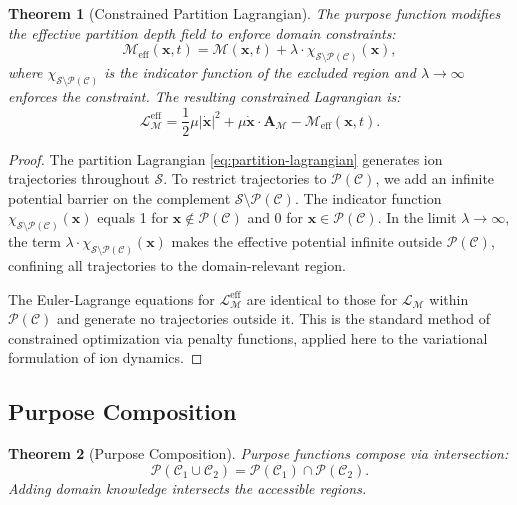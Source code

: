 \documentclass[11pt,twocolumn,a4paper]{article}
\newtheorem{theorem}{Theorem}[section]
\theoremstyle{definition}
\theoremstyle{remark}
\newcommand{\Sspace}{\mathcal{S}}
\newcommand{\Depth}{\mathcal{M}}
\newcommand{\partinert}{\mu}
\newcommand{\Apartition}{\mathbf{A}_{\mathcal{M}}}
\newcommand{\Lagr}{\mathcal{L}}
\newcommand{\Purpose}{\mathcal{P}}
\newcommand{\Context}{\mathcal{C}}
\begin{document}
\begin{theorem}[Constrained Partition Lagrangian]\label{thm:constrained-lagrangian}
The purpose function modifies the effective partition depth field to enforce domain constraints:
\begin{equation}\label{eq:constrained-lagrangian}
  \Depth_{\mathrm{eff}}(\mathbf{x}, t) = \Depth(\mathbf{x}, t) + \lambda \cdot \chi_{\Sspace \setminus \Purpose(\Context)}(\mathbf{x}),
\end{equation}
where $\chi_{\Sspace \setminus \Purpose(\Context)}$ is the indicator function of the excluded region and $\lambda \to \infty$ enforces the constraint. The resulting constrained Lagrangian is:
\begin{equation}\label{eq:lagrangian-constrained}
  \Lagr_{\Depth}^{\mathrm{eff}} = \frac{1}{2}\partinert |\dot{\mathbf{x}}|^2 + \partinert \dot{\mathbf{x}} \cdot \Apartition - \Depth_{\mathrm{eff}}(\mathbf{x}, t).
\end{equation}
\end{theorem}

\begin{proof}
The partition Lagrangian \eqref{eq:partition-lagrangian} generates ion trajectories throughout $\Sspace$. To restrict trajectories to $\Purpose(\Context)$, we add an infinite potential barrier on the complement $\Sspace \setminus \Purpose(\Context)$. The indicator function $\chi_{\Sspace \setminus \Purpose(\Context)}(\mathbf{x})$ equals 1 for $\mathbf{x} \notin \Purpose(\Context)$ and 0 for $\mathbf{x} \in \Purpose(\Context)$. In the limit $\lambda \to \infty$, the term $\lambda \cdot \chi_{\Sspace \setminus \Purpose(\Context)}(\mathbf{x})$ makes the effective potential infinite outside $\Purpose(\Context)$, confining all trajectories to the domain-relevant region.

The Euler-Lagrange equations for $\Lagr_{\Depth}^{\mathrm{eff}}$ are identical to those for $\Lagr_{\Depth}$ within $\Purpose(\Context)$ and generate no trajectories outside it. This is the standard method of constrained optimization via penalty functions, applied here to the variational formulation of ion dynamics.
\end{proof}

\subsection{Purpose Composition}\label{sec:purpose-composition}

\begin{theorem}[Purpose Composition]\label{thm:purpose-composition}
Purpose functions compose via intersection:
\begin{equation}\label{eq:purpose-composition}
  \Purpose(\Context_1 \cup \Context_2) = \Purpose(\Context_1) \cap \Purpose(\Context_2).
\end{equation}
Adding domain knowledge intersects the accessible regions.
\end{theorem}
\end{document}
